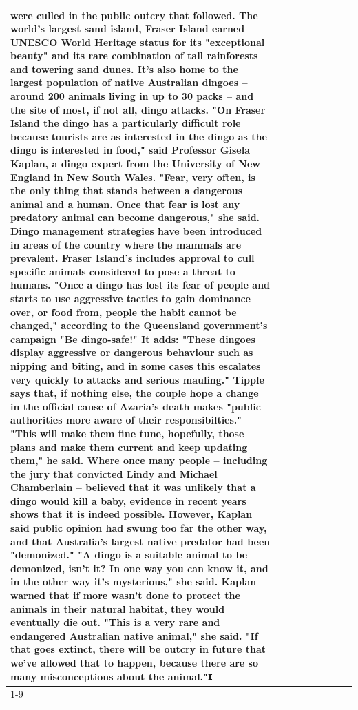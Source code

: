 \begin{table}[H]
\begin{tabular}{lllrlllll}
were culled in the public outcry that followed. The world's largest sand island, Fraser Island earned UNESCO World Heritage status for its "exceptional beauty" and its rare combination of tall rainforests and towering sand dunes. It's also home to the largest population of native Australian dingoes -- around 200 animals living in up to 30 packs -- and the site of most, if not all, dingo attacks. "On Fraser Island the dingo has a particularly difficult role because tourists are as interested in the dingo as the dingo is interested in food," said Professor Gisela Kaplan, a dingo expert from the University of New England in New South Wales. "Fear, very often, is the only thing that stands between a dangerous animal and a human. Once that fear is lost any predatory animal can become dangerous," she said. Dingo management strategies have been introduced in areas of the country where the mammals are prevalent. Fraser Island's includes approval to cull specific animals considered to pose a threat to humans. "Once a dingo has lost its fear of people and starts to use aggressive tactics to gain dominance over, or food from, people the habit cannot be changed," according to the Queensland government's campaign "Be dingo-safe!" It adds: "These dingoes display aggressive or dangerous behaviour such as nipping and biting, and in some cases this escalates very quickly to attacks and serious mauling." Tipple says that, if nothing else, the couple hope a change in the official cause of Azaria's death makes "public authorities more aware of their responsibilties." "This will make them fine tune, hopefully, those plans and make them current and keep updating them," he said. Where once many people -- including the jury that convicted Lindy and Michael Chamberlain -- believed that it was unlikely that a dingo would kill a baby, evidence in recent years shows that it is indeed possible. However, Kaplan said public opinion had swung too far the other way, and that Australia's largest native predator had been "demonized." "A dingo is a suitable animal to be demonized, isn't it? In one way you can know it, and in the other way it's mysterious," she said. Kaplan warned that if more wasn't done to protect the animals in their natural habitat, they would eventually die out. "This is a very rare and endangered Australian native animal," she said. "If that goes extinct, there will be outcry in future that we've allowed that to happen, because there are so many misconceptions about the animal."𝗜 \\
\cline{1-9}

\end{tabular}
\end{table}
